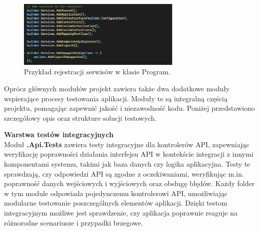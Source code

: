 \documentclass[12pt,a4paper]{article}
\begin{document}
\vspace{0.5cm}
\begin{figure}[h!]
    \centering
    \includegraphics[width=0.7\textwidth]{images/ex_add_services.png}
    \caption{Przykład rejestracji serwisów w klasie Program.}
\end{figure}
\vspace{0.5cm}

\noindent 
Oprócz głównych modułów projekt zawiera także dwa dodatkowe moduły wspierające procesy testowania aplikacji. Moduły te są integralną częścią projektu, pomagając zapewnić jakość i niezawodność kodu. Poniżej przedstawiono szczegółowy opis oraz strukture solucji testowych.

\newpage

\noindent \textbf{Warstwa testów integracyjnych}\\
Moduł \textbf{.Api.Tests} zawiera testy integracyjne dla kontrolerów API, zapewniając weryfikację poprawności działania interfejsu API w kontekście integracji z innymi komponentami systemu, takimi jak baza danych czy logika aplikacyjna. Testy te sprawdzają, czy odpowiedzi API są zgodne z oczekiwaniami, weryfikując m.in. poprawność danych wejściowych i wyjściowych oraz obsługę błędów. Każdy folder w tym module odpowiada pojedynczemu kontrolerowi API, umożliwiając modularne testowanie poszczególnych elementów aplikacji. Dzięki testom integracyjnym możliwe jest sprawdzenie, czy aplikacja poprawnie reaguje na różnorodne scenariusze i przypadki brzegowe.
\end{document}
